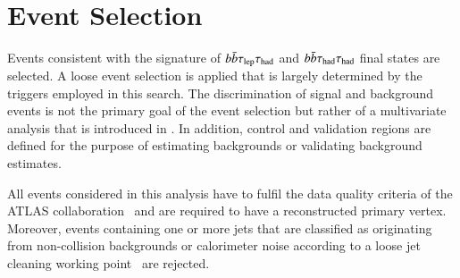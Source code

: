 \section{Event Selection}%
\label{sec:event_selection}

Events consistent with the signature of $b\bar{b}\tau_{\text{lep}}\tau_{\text{had}}$ and $b\bar{b}\tau_{\text{had}}\tau_{\text{had}}$
final states are selected. A loose event selection is applied that is largely
determined by the triggers employed in this search. The discrimination of signal
and background events is not the primary goal of the event selection but rather
of a multivariate analysis that is introduced in
. In addition, control and validation regions
are defined for the purpose of estimating backgrounds or validating background
estimates.

All events considered in this analysis have to fulfil the data quality criteria
of the ATLAS collaboration~\cite{DAPR-2018-01} and are required to have a
reconstructed primary vertex. Moreover, events containing one or more jets that
are classified as originating from non-collision backgrounds or calorimeter
noise according to a loose jet cleaning working point~\cite{ATLAS-CONF-2015-029}
are rejected.





